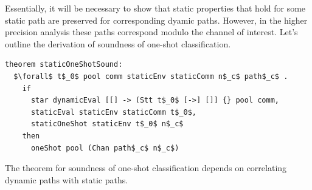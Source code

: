 \documentclass[letterpaper, 11pt]{extarticle}
\begin{document}
Essentially, it will be necessary to show that static
properties that hold for some static path are preserved for corresponding dyamic paths. 
However, in the higher precision analysis these paths correspond modulo the channel of interest.
Let's outline the derivation of soundness of one-shot classification.

\begin{lstlisting}[language=logic, mathescape]
  theorem staticOneShotSound:
  $\forall$ t$_0$ pool comm staticEnv staticComm n$_c$ path$_c$ . 
    if
      star dynamicEval [[] -> (Stt t$_0$ [->] []] {} pool comm,
      staticEval staticEnv staticComm t$_0$,
      staticOneShot staticEnv t$_0$ n$_c$
    then 
      oneShot pool (Chan path$_c$ n$_c$)
\end{lstlisting}

The theorem for soundness of one-shot classification depends on
correlating dynamic paths with static paths.
\end{document}

